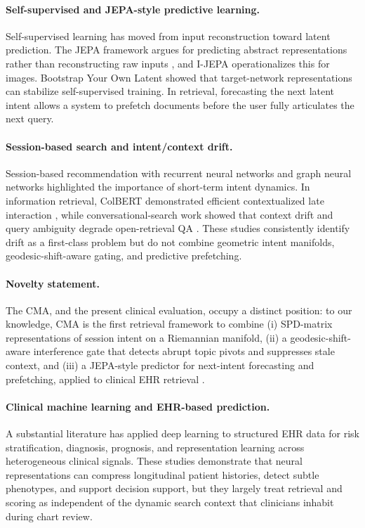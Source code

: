 \documentclass[preprint,12pt]{elsarticle}
\begin{document}
\paragraph{Self-supervised and JEPA-style predictive learning.} Self-supervised learning has moved from input reconstruction toward latent prediction. The JEPA framework argues for predicting abstract representations rather than reconstructing raw inputs \citep{lecun2022}, and I-JEPA \citep{assran2023_ijepa} operationalizes this for images. Bootstrap Your Own Latent \citep{grill20} showed that target-network representations can stabilize self-supervised training. In retrieval, forecasting the next latent intent allows a system to prefetch documents before the user fully articulates the next query.

\paragraph{Session-based search and intent/context drift.} Session-based recommendation with recurrent neural networks \citep{hidasi2015} and graph neural networks \citep{wu2019_session} highlighted the importance of short-term intent dynamics. In information retrieval, ColBERT demonstrated efficient contextualized late interaction \citep{khattab20}, while conversational-search work showed that context drift and query ambiguity degrade open-retrieval QA \citep{iyyer20,zamani20}. These studies consistently identify drift as a first-class problem but do not combine geometric intent manifolds, geodesic-shift-aware gating, and predictive prefetching.

\paragraph{Novelty statement.} The CMA, and the present clinical evaluation, occupy a distinct position: to our knowledge, CMA is the first retrieval framework to combine (i) SPD-matrix representations of session intent on a Riemannian manifold, (ii) a geodesic-shift-aware interference gate that detects abrupt topic pivots and suppresses stale context, and (iii) a JEPA-style predictor for next-intent forecasting and prefetching, applied to clinical EHR retrieval \citep{cma2026}.



\paragraph{Clinical machine learning and EHR-based prediction.}
A substantial literature has applied deep learning to structured EHR data for risk stratification, diagnosis, prognosis, and representation learning across heterogeneous clinical signals. \citep{chapman09,wang18,ouztzn25,campagner25,kwon24,zhou00,yue24,su26,yu25,mesinovic26,zhang26,liu26,chen26,zhang21,manthena24,liu25,woo25,sharma25,jayasurya26,ghosh00,vahdani25,lee20,hons24,thorlund20,mao20,chevance20,schwamm20,quarta25} These studies demonstrate that neural representations can compress longitudinal patient histories, detect subtle phenotypes, and support decision support, but they largely treat retrieval and scoring as independent of the dynamic search context that clinicians inhabit during chart review.
\end{document}
